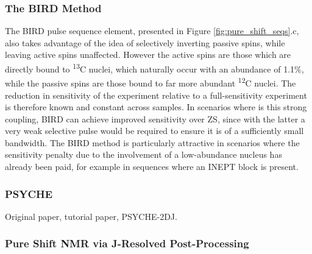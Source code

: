 \subsubsection{The \acs{BIRD} Method}
The \ac{BIRD} pulse sequence element\cite{Garbow1982,Bax1983}, presented in
Figure \ref{fig:pure_shift_seqs}.c, also takes advantage of the idea of
selectively inverting passive spins, while leaving active spins unaffected.
However the active spins are those which are directly bound to
\textsuperscript{13}C nuclei, which naturally occur with an abundance of 1.1\%,
while the passive spins are those bound to far more abundant
\textsuperscript{12}C nuclei. The reduction in sensitivity of the experiment
relative to a full-sensitivity experiment is therefore known and constant
across samples. In scenarios where is this strong coupling, \ac{BIRD} can
achieve improved sensitivity over \ac{ZS}, since with the latter a very weak
selective pulse would be required to ensure it is of a sufficiently small
bandwidth. The \ac{BIRD} method is particularly attractive in scenarios where
the sensitivity penalty due to the involvement of a low-abundance nucleus has
already been paid, for example in sequences where an \ac{INEPT} block is present.

\subsubsection{PSYCHE}
\label{subsec:psyche}
Original paper\cite{Foroozandeh2014}, tutorial paper\cite{Foroozandeh2018}, PSYCHE-2DJ\cite{Kiraly2017}.

\subsubsection{Pure Shift NMR via J-Resolved Post-Processing}

